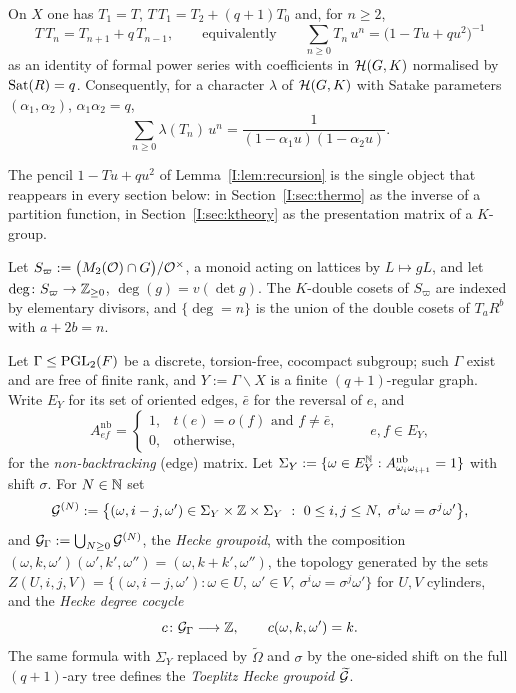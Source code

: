 \begin{lemma}\label{I:lem:recursion}
On $X$ one has $T_1=T$, $T\,T_1=T_2+(q+1)T_0$ and, for $n\ge2$,
\[
T\,T_n=T_{n+1}+q\,T_{n-1},
\qquad\text{equivalently}\qquad
\sum_{n\ge0}T_n\,u^n=\bigl(1-Tu+qu^2\bigr)^{-1}
\]
as an identity of formal power series with coefficients in $\mathcal{H}(G,K)$ normalised by
$\operatorname{Sat}(R)=q$. Consequently, for a character $\lambda$ of $\mathcal{H}(G,K)$ with Satake
parameters $(\alpha_1,\alpha_2)$, $\alpha_1\alpha_2=q$,
\begin{equation}\label{I:eq:heckegen}
\sum_{n\ge0}\lambda(T_n)\,u^n=\frac1{(1-\alpha_1u)(1-\alpha_2u)} .
\end{equation}
\end{lemma}

The pencil $1-Tu+qu^2$ of Lemma~\ref{I:lem:recursion} is the single object that reappears
in every section below: in Section~\ref{I:sec:thermo} as the inverse of a partition
function, in Section~\ref{I:sec:ktheory} as the presentation matrix of a $K$-group.

\begin{definition}\label{I:def:monoid}
Let $S_\varpi:=\bigl(M_2(\mathcal{O})\cap G\bigr)/\mathcal{O}^\times$, a monoid acting on lattices by
$L\mapsto gL$, and let $\deg\colon S_\varpi\to\mathbb{Z}_{\ge0}$, $\deg(g)=v(\det g)$. The
$K$-double cosets of $S_\varpi$ are indexed by elementary divisors, and
$\{\deg=n\}$ is the union of the double cosets of $T_a R^b$ with $a+2b=n$.
\end{definition}

\begin{definition}\label{I:def:groupoid}
Let $\Gamma\le\mathrm{PGL}_2(F)$ be a discrete, torsion-free, cocompact subgroup; such $\Gamma$
exist and are free of finite rank, and $Y:=\Gamma\backslash X$ is a finite
$(q+1)$-regular graph. Write $E_Y$ for its set of oriented edges, $\bar e$ for the
reversal of $e$, and
\[
A^{\mathrm{nb}}_{ef}=\begin{cases}1,&t(e)=o(f)\text{ and }f\neq\bar e,\\
0,&\text{otherwise},\end{cases}
\qquad e,f\in E_Y,
\]
for the \emph{non-backtracking} (edge) matrix. Let
$\Sigma_Y:=\{\omega\in E_Y^{\mathbb{N}}:A^{\mathrm{nb}}_{\omega_i\omega_{i+1}}=1\}$ with shift
$\sigma$. For $N\in\mathbb{N}$ set
\begin{equation}\label{I:eq:truncgroupoid}
\cG^{(N)}:=\bigl\{(\omega,i-j,\omega')\in\Sigma_Y\times\Z\times\Sigma_Y\ :\
0\le i,j\le N,\ \sigma^i\omega=\sigma^j\omega'\bigr\},
\end{equation}
and $\mathcal{G}_\Gamma:=\bigcup_{N\ge0}\mathcal{G}^{(N)}$, the \emph{Hecke groupoid}, with the
composition $(\omega,k,\omega')(\omega',k',\omega'')=(\omega,k+k',\omega'')$, the
topology generated by the sets
$Z(U,i,j,V)=\{(\omega,i-j,\omega'):\omega\in U,\ \omega'\in V,\ \sigma^i\omega=\sigma^j\omega'\}$
for $U,V$ cylinders, and the \emph{Hecke degree cocycle}
\[
c\colon\mathcal{G}_\Gamma\longrightarrow\mathbb{Z},\qquad c(\omega,k,\omega')=k .
\]
The same formula with $\Sigma_Y$ replaced by $\widetilde\Omega$ and $\sigma$ by the
one-sided shift on the full $(q+1)$-ary tree defines the \emph{Toeplitz Hecke groupoid}
$\widetilde{\mathcal{G}}$.
\end{definition}

